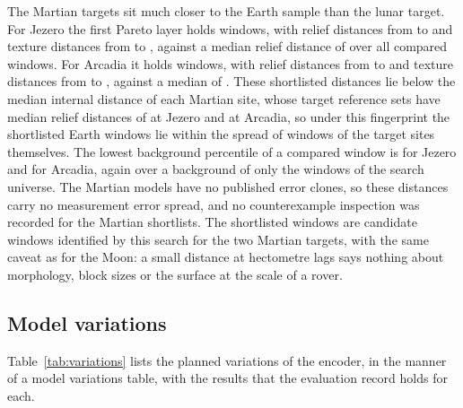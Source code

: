 The Martian targets sit much closer to the Earth sample than the lunar target. For Jezero the first Pareto layer holds \JezeroShortlistSize{} windows, with relief distances from \JezeroShortReliefMin{} to \JezeroShortReliefMax{} and texture distances from \JezeroShortTextureMin{} to \JezeroShortTextureMax, against a median relief distance of \JezeroReliefMedian{} over all compared windows. For Arcadia it holds \ArcadiaShortlistSize{} windows, with relief distances from \ArcadiaShortReliefMin{} to \ArcadiaShortReliefMax{} and texture distances from \ArcadiaShortTextureMin{} to \ArcadiaShortTextureMax, against a median of \ArcadiaReliefMedian. These shortlisted distances lie below the median internal distance of each Martian site, whose target reference sets have median relief distances of \JezeroRefReliefMedian{} at Jezero and \ArcadiaRefReliefMedian{} at Arcadia, so under this fingerprint the shortlisted Earth windows lie within the spread of windows of the target sites themselves. The lowest background percentile of a compared window is \JezeroBgPctMin{} for Jezero and \ArcadiaBgPctMin{} for Arcadia, again over a background of only the \JezeroBackgroundN{} windows of the search universe. The Martian models have no published error clones, so these distances carry no measurement error spread, and no counterexample inspection was recorded for the Martian shortlists. The shortlisted windows are candidate windows identified by this search for the two Martian targets, with the same caveat as for the Moon: a small distance at hectometre lags says nothing about morphology, block sizes or the surface at the scale of a rover.

\subsection{Model variations}
\label{sec:results-variations}

Table~\ref{tab:variations} lists the planned variations of the encoder, in the manner of a model
variations table, with the results that the evaluation record holds for each.


